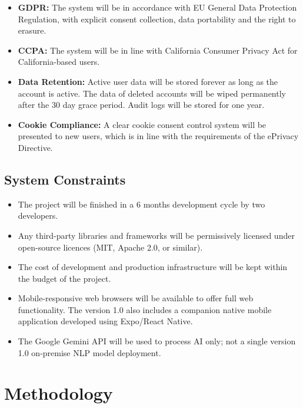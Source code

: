 \documentclass[12pt, a4paper, oneside]{report}
\begin{document}
\begin{itemize}
    \item \textbf{GDPR:} The system will be in accordance with EU General Data Protection Regulation\cite{gdpr2016}, with explicit consent collection, data portability and the right to erasure.
    \item \textbf{CCPA:} The system will be in line with California Consumer Privacy Act \cite{ccpa2018} for California-based users.
    \item \textbf{Data Retention:} Active user data will be stored forever as long as the account is active. The data of deleted accounts will be wiped permanently after the 30 day grace period. Audit logs will be stored for one year.
    \item \textbf{Cookie Compliance:} A clear cookie consent control system will be presented to new users, which is in line with the requirements of the ePrivacy Directive.
\end{itemize}

\section{System Constraints}

\begin{itemize}
    \item The project will be finished in a 6 months development cycle by two developers.
    \item Any third-party libraries and frameworks will be permissively licensed under open-source licences (MIT, Apache 2.0, or similar).
    \item The cost of development and production infrastructure will be kept within the budget of the project.
    \item Mobile-responsive web browsers will be available to offer full web functionality. The version 1.0 also includes a companion native mobile application developed using Expo/React Native.
    \item The Google Gemini API will be used to process AI\cite{gemini2023} only; not a single version 1.0 on-premise NLP model deployment.
\end{itemize}

\chapter{Methodology}
\end{document}
